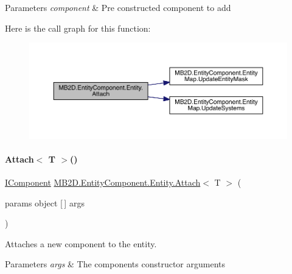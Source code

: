 \begin{DoxyParams}{Parameters}
{\em component} & Pre constructed component to add\\
\hline
\end{DoxyParams}
Here is the call graph for this function\+:
\nopagebreak
\begin{figure}[H]
\begin{center}
\leavevmode
\includegraphics[width=350pt]{class_m_b2_d_1_1_entity_component_1_1_entity_aa86d1be62df6d89b981d1000c856a306_cgraph}
\end{center}
\end{figure}
\hypertarget{class_m_b2_d_1_1_entity_component_1_1_entity_a53ffea8d43423903712540fc2df6b82d}{}\label{class_m_b2_d_1_1_entity_component_1_1_entity_a53ffea8d43423903712540fc2df6b82d} 
\paragraph{\texorpdfstring{Attach$<$ T $>$()}{Attach< T >()}}
{\footnotesize\ttfamily \hyperlink{interface_m_b2_d_1_1_entity_component_1_1_i_component}{I\+Component} \hyperlink{class_m_b2_d_1_1_entity_component_1_1_entity_aa86d1be62df6d89b981d1000c856a306}{M\+B2\+D.\+Entity\+Component.\+Entity.\+Attach}$<$ T $>$ (\begin{DoxyParamCaption}\item[{params object \mbox{[}$\,$\mbox{]}}]{args }\end{DoxyParamCaption})\hspace{0.3cm}{\ttfamily [inline]}}



Attaches a new component to the entity. 


\begin{DoxyParams}{Parameters}
{\em args} & The components constructor arguments\\
\hline
\end{DoxyParams}

